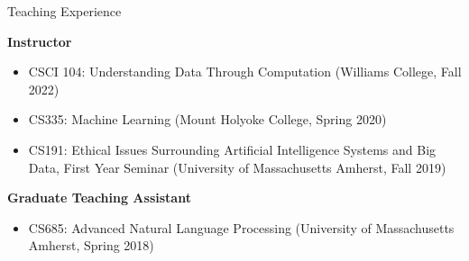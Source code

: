 \documentclass{resume} %
\begin{document}
\begin{rSection}{Teaching Experience}

\textbf{Instructor}
\begin{itemize}
  \item CSCI 104: Understanding Data Through Computation (Williams College, Fall 2022)
  \item CS335: Machine Learning (Mount Holyoke College, Spring 2020)
  \item CS191: Ethical Issues Surrounding Artificial Intelligence Systems and Big Data, First Year Seminar (University of Massachusetts Amherst, Fall 2019)

\end{itemize}

\textbf{Graduate Teaching Assistant}
\begin{itemize}
\item CS685: Advanced Natural Language Processing (University of Massachusetts Amherst, Spring 2018)
\end{itemize}







\end{rSection}
\end{document}
